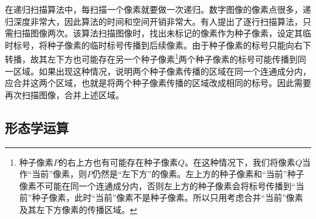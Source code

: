 在递归扫描算法中，每扫描一个像素就要做一次递归。数字图像的像素点很多，递归深度非常大，因此算法的时间和空间开销非常大。有人提出了逐行扫描算法，只需扫描图像两次。该算法扫描图像时，找出未标记的像素作为种子像素，设定其临时标号，将种子像素的临时标号传播到后续像素。由于种子像素的标号只能向右下转播，故其左下方也可能存在另一个种子像素\footnote{种子像素$P$的右上方也有可能存在种子像素$Q$。在这种情况下，我们将像素$Q$当作“当前”像素，则$P$仍然是“左下方”的像素。左上方的种子像素和“当前”种子像素不可能在同一个连通成分内，否则左上方的种子像素会将标号传播到“当前”种子像素，此时“当前”像素不是种子像素。所以只用考虑合并“当前”像素及其左下方像素的传播区域。}两个种子像素的标号可能传播到同一区域。如果出现这种情况，说明两个种子像素传播的区域在同一个连通成分内，应合并这两个区域，也就是将两个种子像素传播的区域改成相同的标号。因此需要再次扫描图像，合并上述区域。

\subsection{形态学运算}
